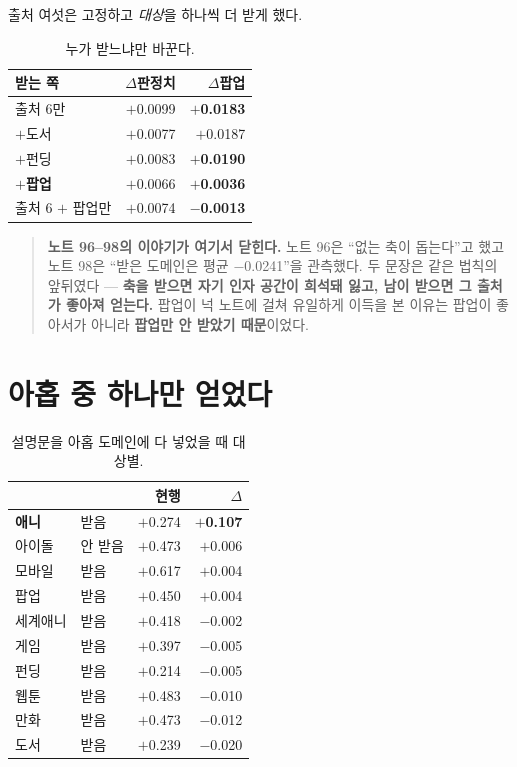\documentclass[10pt]{article}
\begin{document}
출처 여섯은 고정하고 \emph{대상}을 하나씩 더 받게 했다.

\begin{table}[t]
\centering\tsize
\caption{누가 받느냐만 바꾼다.}
\begin{tabular}{lrr}
\toprule
받는 쪽 & $\Delta$판정치 & $\Delta$팝업 \\
\midrule
출처 6만 & $+$0.0099 & \textbf{$+$0.0183} \\
$+$도서 & $+$0.0077 & $+$0.0187 \\
$+$펀딩 & $+$0.0083 & \textbf{$+$0.0190} \\
\midrule
$+$\textbf{팝업} & $+$0.0066 & \textbf{$+$0.0036} \\
출처 6 $+$ 팝업만 & $+$0.0074 & \textbf{$-$0.0013} \\
\bottomrule
\end{tabular}
\end{table}


\begin{quote}\fontsize{9.5}{11.5}\selectfont
\textbf{노트 96--98의 이야기가 여기서 닫힌다.} 노트 96은 ``없는 축이 돕는다''고
했고 노트 98은 ``받은 도메인은 평균 $-$0.0241''을 관측했다. 두 문장은 같은
법칙의 앞뒤였다 --- \textbf{축을 받으면 자기 인자 공간이 희석돼 잃고, 남이
받으면 그 출처가 좋아져 얻는다.} 팝업이 넉 노트에 걸쳐 유일하게 이득을 본
이유는 팝업이 좋아서가 아니라 \textbf{팝업만 안 받았기 때문}이었다.
\end{quote}

\section{아홉 중 하나만 얻었다}

\begin{table}[t]
\centering\tsize
\caption{설명문을 아홉 도메인에 다 넣었을 때 대상별.}
\begin{tabular}{llrr}
\toprule
& & 현행 & $\Delta$ \\
\midrule
\textbf{애니} & 받음 & $+$0.274 & \textbf{$+$0.107} \\
아이돌 & 안 받음 & $+$0.473 & $+$0.006 \\
모바일 & 받음 & $+$0.617 & $+$0.004 \\
팝업 & 받음 & $+$0.450 & $+$0.004 \\
세계애니 & 받음 & $+$0.418 & $-$0.002 \\
게임 & 받음 & $+$0.397 & $-$0.005 \\
펀딩 & 받음 & $+$0.214 & $-$0.005 \\
웹툰 & 받음 & $+$0.483 & $-$0.010 \\
만화 & 받음 & $+$0.473 & $-$0.012 \\
도서 & 받음 & $+$0.239 & $-$0.020 \\
\bottomrule
\end{tabular}
\end{table}
\end{document}
